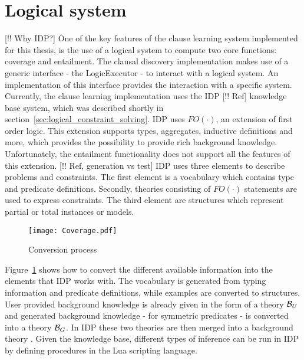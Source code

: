 \section{Logical system} [!! Why IDP?]
\label{sec:logical_system}
One of the key features of the clause learning system implemented for this thesis, is the use of a logical system to compute two core functions: coverage and entailment. The clausal discovery implementation makes use of a generic  interface - the LogicExecutor - to interact with a logical system. An implementation of this interface provides the interaction with a specific system. Currently, the clause learning implementation uses the IDP [!! Ref] knowledge base system, which was described shortly in section~\ref{sec:logical_constraint_solving}. IDP uses $FO(\cdotp)$, an extension of first order logic. This extension supports types, aggregates, inductive definitions and more, which provides the possibility to provide rich background knowledge. Unfortunately, the entailment functionality does not support all the features of this extension. [!! Ref, generation vs test] IDP uses three elements to describe problems and constraints. The first element is a vocabulary which contains type and predicate definitions. Secondly, theories consisting of $FO(\cdotp)$ statements are used to express constraints. The third element are structures which represent partial or total instances or models.

\begin{figure}

	\caption{Conversion process}
	\centering
		\texttt{[image: Coverage.pdf]}
	\label{fig:conversion_to_logic}

\end{figure}

Figure~\ref{fig:conversion_to_logic} shows how to convert the different available information into the elements that IDP works with. The vocabulary is generated from typing information and predicate definitions, while examples are converted to structures. User provided background knowledge is already given in the form of a theory $\mathcal{B}_U$ and generated background knowledge - for symmetric predicates - is converted into a theory $\mathcal{B}_G$. In IDP these two theories are then merged into a background theory . Given the knowledge base, different types of inference can be run in IDP by defining procedures in the Lua scripting language.

